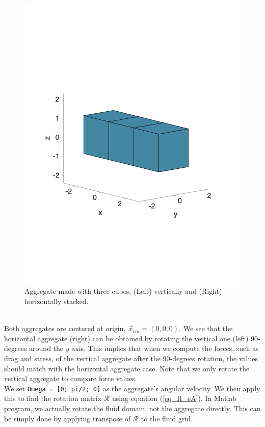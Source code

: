 \begin{figure}[h]
\begin{center}
			\includegraphics[scale=0.35]{./figures/fig_NC3_hor}		
    	\caption{Aggregate made with three cubes; (Left) vertically and (Right) horizontally stacked.}
    	\label{fig_NC3_hor_vert}
    \end{center}
\end{figure}
\\
Both aggregates are centered at origin, $\vec{x}_{cm} = (0,0,0)$.
We see that the horizontal aggregate (right) can be obtained by rotating the vertical one (left) 90-degrees around the $y$ axis. This implies that when we compute the forces, such as drag and stress, of the vertical aggregate after the 90-degrees rotation, the values should match with the horizontal aggregate case. Note that we only rotate the vertical aggregate to compare force values. 
\\
We set \verb+Omega = [0; pi/2; 0]+ as the aggregate's angular velocity. We then apply this to find the rotation matrix $\mathcal{R}$ using equation (\ref{eq_R_eA}). In Matlab program, we actually rotate the fluid domain, not the aggregate directly. This can be simply done by applying transpose of $\mathcal{R}$ to the fluid grid. 

